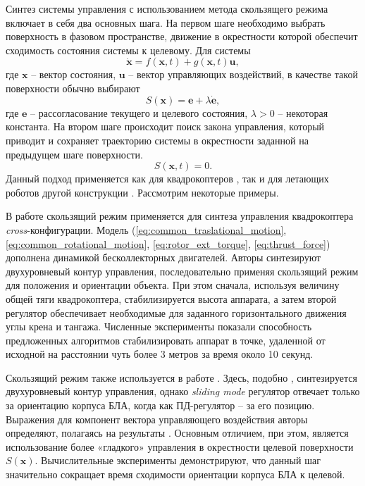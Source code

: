 Синтез системы управления с использованием метода скользящего режима включает в себя два основных шага. На первом шаге необходимо выбрать поверхность в фазовом пространстве, движение в окрестности которой обеспечит сходимость состояния системы к целевому. Для системы
\begin{equation} \label{eq:slide_mode_system}
\dot{\bm x} = f(\bm x, t) + g( \bm x, t) \bm u,
\end{equation}
где $\bm x$ -- вектор состояния, $\bm u$ -- вектор управляющих воздействий, в качестве такой поверхности обычно выбирают \cite{Samir01}
\begin{equation} \label{eq:slide_mode_S}
S(\bm x) = \bm e + \lambda \dot{\bm e},
\end{equation}
где $\bm e$ -- рассогласование текущего и целевого состояния, $\lambda > 0$ -- некоторая константа. На втором шаге происходит поиск закона управления, который приводит и сохраняет траекторию системы в окрестности заданной на предыдущем шаге поверхности.
\begin{equation} \label{eq:slide_mode_on_S}
S(\bm x,t) = 0.
\end{equation}
Данный подход применяется как для квадрокоптеров \cite{Stevanovic01, Lebedev01, Xu01}, так и для летающих роботов другой конструкции \cite{Yih01, Zhu01}. Рассмотрим некоторые примеры.

В работе \cite{Samir01} скользящий режим применяется для синтеза управления квадрокоптера \textit{cross}-конфигурации.
Модель (\ref{eq:common_traslational_motion}, \ref{eq:common_rotational_motion}, \ref{eq:rotor_ext_torque}, \ref{eq:thrust_force}) дополнена динамикой бесколлекторных двигателей.
Авторы синтезируют двухуровневый контур управления, последовательно применяя скользящий режим для положения и ориентации объекта. При этом сначала, используя величину общей тяги квадрокоптера, стабилизируется высота аппарата, а затем второй регулятор обеспечивает необходимые для заданного горизонтального движения углы крена и тангажа. Численные эксперименты показали способность предложенных алгоритмов стабилизировать аппарат в точке, удаленной от исходной на расстоянии чуть более 3 метров за время около 10 секунд.

Скользящий режим также используется в работе \cite{Runcharoon01}. Здесь, подобно \cite{Samir01}, синтезируется двухуровневый контур управления, однако \textit{sliding mode} регулятор отвечает только за ориентацию корпуса БЛА, когда как ПД-регулятор -- за его позицию. Выражения для компонент вектора управляющего воздействия авторы определяют, полагаясь на результаты \cite{Slotine01}. Основным отличием, при этом, является использование более «гладкого» управления в окрестности целевой поверхности $S(\bm x)$. Вычислительные эксперименты демонстрируют, что данный шаг значительно сокращает время сходимости  ориентации корпуса БЛА к целевой. 


